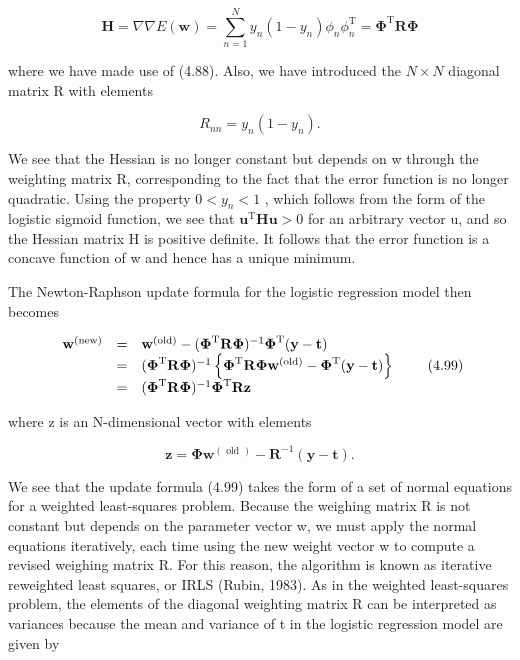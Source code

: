 \documentclass[
  10
]{article}
\begin{document}
\[
\mathbf {H} = \nabla \nabla E (\mathbf {w}) = \sum_ {n = 1} ^ {N} y _ {n} (1 - y _ {n}) \phi_ {n} \phi_ {n} ^ {\mathrm{T}} = \boldsymbol {\Phi} ^ {\mathrm{T}} \mathbf {R} \boldsymbol {\Phi}\tag{4.97}
\]

where we have made use of (4.88). Also, we have introduced the
\(N \times N\) diagonal matrix R with elements

\[
R _ {n n} = y _ {n} (1 - y _ {n}).\tag{4.98}
\]

We see that the Hessian is no longer constant but depends on w through
the weighting matrix R, corresponding to the fact that the error
function is no longer quadratic. Using the property
\(0 < y _ { n } < 1\) , which follows from the form of the logistic
sigmoid function, we see that
\(\mathbf { u } ^ { \mathrm { T } } \mathbf { H } \mathbf { u } > 0\)
for an arbitrary vector u, and so the Hessian matrix H is positive
definite. It follows that the error function is a concave function of w
and hence has a unique minimum.

The Newton-Raphson update formula for the logistic regression model then
becomes

\[
\begin{array}{r c l} \mathbf {w} ^ {\text {(new)}} & = & \mathbf {w} ^ {\text {(old)}} - (\boldsymbol {\Phi} ^ {\mathrm{T}} \mathbf {R} \boldsymbol {\Phi}) ^ {- 1} \boldsymbol {\Phi} ^ {\mathrm{T}} (\mathbf {y} - \mathbf {t}) \\ & = & (\boldsymbol {\Phi} ^ {\mathrm{T}} \mathbf {R} \boldsymbol {\Phi}) ^ {- 1} \left\{\boldsymbol {\Phi} ^ {\mathrm{T}} \mathbf {R} \boldsymbol {\Phi} \mathbf {w} ^ {\text {(old)}} - \boldsymbol {\Phi} ^ {\mathrm{T}} (\mathbf {y} - \mathbf {t}) \right\} \\ & = & (\boldsymbol {\Phi} ^ {\mathrm{T}} \mathbf {R} \boldsymbol {\Phi}) ^ {- 1} \boldsymbol {\Phi} ^ {\mathrm{T}} \mathbf {R} \mathbf {z} \end{array}\tag{4.99}
\]

where z is an N-dimensional vector with elements

\[
\mathbf {z} = \boldsymbol {\Phi} \mathbf {w} ^ {(\text { old })} - \mathbf {R} ^ {- 1} (\mathbf {y} - \mathbf {t}).\tag{4.100}
\]

We see that the update formula (4.99) takes the form of a set of normal
equations for a weighted least-squares problem. Because the weighing
matrix R is not constant but depends on the parameter vector w, we must
apply the normal equations iteratively, each time using the new weight
vector w to compute a revised weighing matrix R. For this reason, the
algorithm is known as iterative reweighted least squares, or IRLS
(Rubin, 1983). As in the weighted least-squares problem, the elements of
the diagonal weighting matrix R can be interpreted as variances because
the mean and variance of t in the logistic regression model are given by
\end{document}
